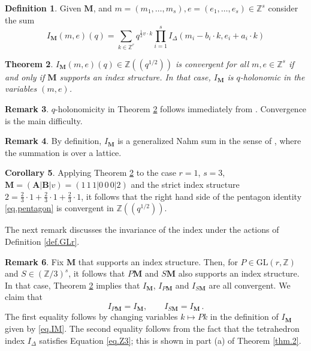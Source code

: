\documentclass[12pt]{amsart}
\newtheorem{theorem}{Theorem}[section]
\theoremstyle{definition}
\newtheorem{definition}[theorem]{Definition}
\newtheorem{remark}[theorem]{Remark}
\newtheorem{corollary}[theorem]{Corollary}
\def\BZ{\mathbb Z}
\def\be{  \begin{equation} }
\def\ee{  \end{equation} }
\def\ID{I_{\Delta}}
\def\GL{\mathrm{GL}}
\newcommand{\mb}{\mathbf}
\numberwithin{equation}{section}
\begin{document}
\begin{definition}
\label{def.IM}
Given $\mb M$, and  $m=(m_1,\dots,m_s), e=(e_1,\dots,e_s) 
\in \BZ^s$ consider the sum
\be
\label{eq.IM}
I_{\mb M}(m,e)(q)=\sum_{k \in \BZ^r}
q^{\frac{1}{2} v \cdot k}
\prod_{i=1}^s \ID(m_i-b_i \cdot k, e_i+a_i \cdot k)
\ee
\end{definition}

\begin{theorem}
\label{thm.IMconv}
$I_{\mb M}(m,e)(q) \in \BZ((q^{1/2}))$ is convergent for all 
$m, e\in \BZ^s$ if and only if $\mb M$ supports an index structure.
In that case, $I_{\mb M}$ is $q$-holonomic in the variables $(m,e)$.
\end{theorem}

\begin{remark}
\label{rem.WZ}
$q$-holonomicity in Theorem \ref{thm.IMconv} follows immediately from 
\cite{WZ}. Convergence is the main difficulty.
\end{remark}

\begin{remark}
\label{rem.nahm}
By definition, $I_{\mb M}$ is a generalized Nahm sum in the sense of
\cite{GL2}, where the summation is over a lattice.
\end{remark}

\begin{corollary}
\label{cor.convP}
Applying Theorem \ref{thm.IMconv} to the case $r=1$, $s=3$,
$\mb M=(\mb A| \mb B|v)=(1 \, 1 \, 1|0 \, 0 \, 0|2)$ and the
strict index structure $2=\frac{2}{3}\cdot 1 + \frac{2}{3}\cdot 1 +
\frac{2}{3}\cdot 1$, it follows that
the right hand side of the pentagon identity \eqref{eq.pentagon}
is convergent in $\BZ((q^{1/2}))$.
\end{corollary}

The next remark discusses the invariance of the index under the actions
of Definition \ref{def.GLr}.

\begin{remark}
\label{rem.GLr}
Fix $\mb M$ that supports an index structure. Then, for $P \in \GL(r,\BZ)$ and 
$S \in (\BZ/3)^s$, it follows that $P \mb M$ and $S \mb M$ also supports
an index structure. In that case, Theorem \ref{thm.IMconv}
implies that $I_{\mb M}$, $I_{P \mb M}$ and $I_{S \mb M}$ are all convergent.
We claim that
$$
I_{P \mb M} = I_{\mb M}, \qquad I_{S \mb M} = I_{\mb M} \,.
$$
The first equality follows by changing variables $k \mapsto P k$ in the
definition of $I_{\mb M}$ given by \eqref{eq.IM}. The second equality follows
from the fact that the tetrahedron index $\ID$ satisfies Equation
\eqref{eq.Z3}; this is shown in part (a) of  Theorem \ref{thm.2}.
\end{remark}
\end{document}
